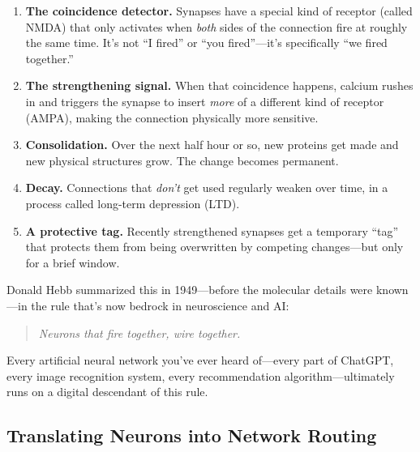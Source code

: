 \documentclass[nobib]{tufte-handout}
\begin{document}
\begin{enumerate}
  \item \textbf{The coincidence detector.} Synapses have a special kind of receptor (called NMDA) that only activates when \emph{both} sides of the connection fire at roughly the same time. It's not ``I fired'' or ``you fired''---it's specifically ``we fired together.''
  \item \textbf{The strengthening signal.} When that coincidence happens, calcium rushes in and triggers the synapse to insert \emph{more} of a different kind of receptor (AMPA), making the connection physically more sensitive.
  \item \textbf{Consolidation.} Over the next half hour or so, new proteins get made and new physical structures grow. The change becomes permanent.
  \item \textbf{Decay.} Connections that \emph{don't} get used regularly weaken over time, in a process called long-term depression (LTD).
  \item \textbf{A protective tag.} Recently strengthened synapses get a temporary ``tag'' that protects them from being overwritten by competing changes---but only for a brief window.
\end{enumerate}

Donald Hebb summarized this in 1949---before the molecular details were known---in the rule that's now bedrock in neuroscience and AI:

\begin{quote}\itshape
Neurons that fire together, wire together.
\end{quote}

Every artificial neural network you've ever heard of---every part of ChatGPT, every image recognition system, every recommendation algorithm---ultimately runs on a digital descendant of this rule.

\subsection{Translating Neurons into Network Routing}
\end{document}
